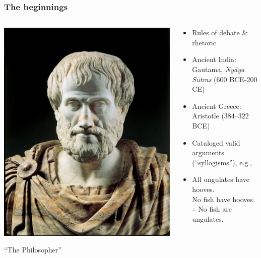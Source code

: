 \begin{frame}
  \frametitle{The beginnings}
  \begin{columns}
    \begin{column}{.5\textwidth}
    \includegraphics[height=.8\textheight]{../assets/aristotle}
    
    ``The Philosopher'' 
    \end{column}
    \begin{column}{.5\textwidth}
      \begin{itemize}[<+->]
        \item Rules of debate \& rhetoric
        \item Ancient India: Gautama, \emph{Ny\=aya S\=utras} (600 BCE-200
        CE)
        \item Ancient Greece: Aristotle (384--322 BCE)
        \item Cataloged valid arguments (``syllogisms''), e.g.,
        \item All ungulates have hooves.\\
        No fish have hooves.\\
        $\therefore$ No fish are ungulates.
      \end{itemize}
    \end{column}
  \end{columns}
\end{frame}

